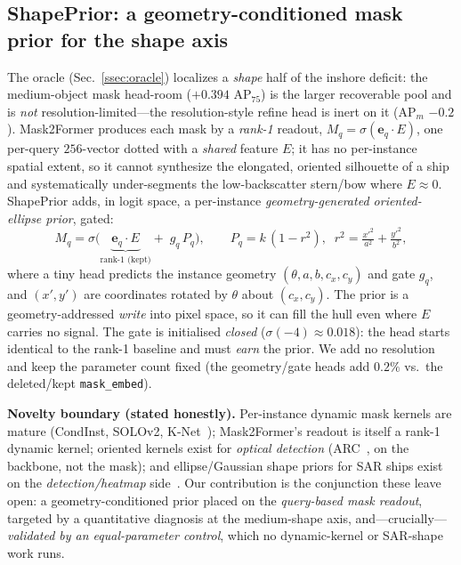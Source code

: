 \newcommand{\FULLtodo}[1]{\textcolor{red}{[3-seed: #1]}}

\subsection{ShapePrior: a geometry-conditioned mask prior for the shape axis}
\label{ssec:shapeprior}
The oracle (Sec.~\ref{ssec:oracle}) localizes a \emph{shape} half of the inshore deficit: the
medium-object mask head-room ($+0.394$ AP$_{75}$) is the larger recoverable pool and is
\emph{not} resolution-limited---the resolution-style refine head is inert on it
(AP$_m$ $-0.2$). Mask2Former produces each mask by a \emph{rank-1} readout,
$M_q=\sigma(\mathbf{e}_q\!\cdot\!E)$, one per-query $256$-vector dotted with a \emph{shared}
feature $E$; it has no per-instance spatial extent, so it cannot synthesize the elongated,
oriented silhouette of a ship and systematically under-segments the low-backscatter
stern/bow where $E\!\approx\!0$. ShapePrior adds, in logit space, a per-instance
\emph{geometry-generated oriented-ellipse prior}, gated:
\begin{equation}
M_q=\sigma\!\big(\underbrace{\mathbf{e}_q\!\cdot\!E}_{\text{rank-1 (kept)}}+\;g_q\,P_q\big),\qquad
P_q=k\,(1-r^2),\;\; r^2=\tfrac{x'^2}{a^2}+\tfrac{y'^2}{b^2},
\label{eq:shapeprior}
\end{equation}
where a tiny head predicts the instance geometry $(\theta,a,b,c_x,c_y)$ and gate $g_q$, and
$(x',y')$ are coordinates rotated by $\theta$ about $(c_x,c_y)$. The prior is a geometry-addressed
\emph{write} into pixel space, so it can fill the hull even where $E$ carries no signal. The gate
is initialised \emph{closed} ($\sigma(-4)\!\approx\!0.018$): the head starts identical to the
rank-1 baseline and must \emph{earn} the prior. We add no resolution and keep the parameter
count fixed (the geometry/gate heads add $0.2\%$ vs.\ the deleted/kept \texttt{mask\_embed}).

\noindent\textbf{Novelty boundary (stated honestly).} Per-instance dynamic mask kernels are
mature (CondInst, SOLOv2, K-Net~\cite{condinst,solov2,knet}); Mask2Former's readout is itself a
rank-1 dynamic kernel; oriented kernels exist for \emph{optical detection}
(ARC~\cite{arc}, on the backbone, not the mask); and ellipse/Gaussian shape priors for SAR ships
exist on the \emph{detection/heatmap} side~\cite{gao2025o2former,sarellipse,mldet,bboxfreesar}.
Our contribution is the conjunction these leave open: a geometry-conditioned prior placed on the
\emph{query-based mask readout}, targeted by a quantitative diagnosis at the medium-shape axis,
and---crucially---\emph{validated by an equal-parameter control}, which no dynamic-kernel or
SAR-shape work runs.


